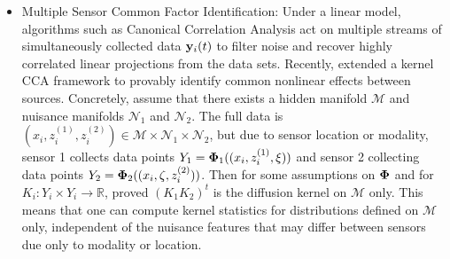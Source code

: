\begin{itemize}
\item Multiple Sensor Common Factor Identification: 
Under a linear model, algorithms such as Canonical Correlation Analysis \cite{hardoon2004canonical} act on multiple streams of simultaneously collected data $\mathbf{y}_i(t)$ to filter noise and recover highly correlated linear projections from  the data sets.
Recently, \cite{lederman2018learning} extended a kernel CCA framework to provably identify common nonlinear effects between sources.
Concretely, assume that there exists a hidden manifold $\mathcal{M}$ and nuisance manifolds $\mathcal{N}_1$ and $\mathcal{N}_2$.
The full data is $(x_i,z_i^{(1)}, z_i^{(2)})\in \mathcal{M}\times \mathcal{N}_1\times \mathcal{N}_2$, but due to sensor location or modality, sensor 1 collects data points $Y_1 = \mathbf{\Phi}_1((x_i,z_i^{(1)}, \xi))$ and sensor 2 collecting data points $Y_2 = \mathbf{\Phi}_2((x_i,\zeta,z_i^{(2)}))$.  Then for some assumptions on $\mathbf{\Phi}$ and for $K_i: Y_i\times Y_i \rightarrow \mathbb{R}$,
\cite{talmon2018latent} proved $(K_1 K_2)^t$ is the diffusion kernel on $\mathcal{M}$ only.   This means that one can compute kernel statistics for distributions defined on $\mathcal{M}$ only, independent of the nuisance features that may differ between sensors due only to modality or location.



\end{itemize}
